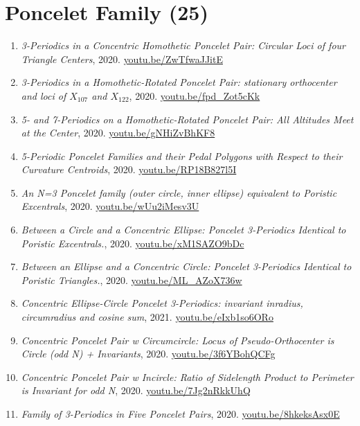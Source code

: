 \documentclass[12pt]{article}
\begin{document}
\section{Poncelet Family (25)}

\begin{enumerate}[resume]
\item \textit{3-Periodics in a Concentric Homothetic Poncelet Pair: Circular Loci of four Triangle Centers}, 2020. \href{https://youtu.be/ZwTfwaJJitE}{\url{youtu.be/ZwTfwaJJitE}}
\item \textit{3-Periodics in a Homothetic-Rotated Poncelet Pair: stationary orthocenter and loci of $X_{107}$ and $X_{122}$}, 2020. \href{https://youtu.be/fpd_Zot5cKk}{\url{youtu.be/fpd\_Zot5cKk}}
\item \textit{5- and 7-Periodics on a Homothetic-Rotated Poncelet Pair: All Altitudes Meet at the Center}, 2020. \href{https://youtu.be/gNHiZvBhKF8}{\url{youtu.be/gNHiZvBhKF8}}
\item \textit{5-Periodic Poncelet Families and their Pedal Polygons with Respect to their Curvature Centroids}, 2020. \href{https://youtu.be/RP18B827l5I}{\url{youtu.be/RP18B827l5I}}
\item \textit{An N=3 Poncelet family (outer circle, inner ellipse) equivalent to Poristic Excentrals}, 2020. \href{https://youtu.be/wUu2iMesv3U}{\url{youtu.be/wUu2iMesv3U}}
\item \textit{Between a Circle and a Concentric Ellipse: Poncelet 3-Periodics Identical to Poristic Excentrals.}, 2020. \href{https://youtu.be/xM1SAZO9bDc}{\url{youtu.be/xM1SAZO9bDc}}
\item \textit{Between an Ellipse and a Concentric Circle: Poncelet 3-Periodics Identical to Poristic Triangles.}, 2020. \href{https://youtu.be/ML_AZoX736w}{\url{youtu.be/ML\_AZoX736w}}
\item \textit{Concentric Ellipse-Circle Poncelet 3-Periodics: invariant inradius, circumradius and cosine sum}, 2021. \href{https://youtu.be/eIxb1so6ORo}{\url{youtu.be/eIxb1so6ORo}}
\item \textit{Concentric Poncelet Pair w Circumcircle: Locus of Pseudo-Orthocenter is Circle (odd N) + Invariants}, 2020. \href{https://youtu.be/3f6YBohQCFg}{\url{youtu.be/3f6YBohQCFg}}
\item \textit{Concentric Poncelet Pair w Incircle: Ratio of Sidelength Product to Perimeter is Invariant for odd N}, 2020. \href{https://youtu.be/7Jg2nRkkUhQ}{\url{youtu.be/7Jg2nRkkUhQ}}
\item \textit{Family of 3-Periodics in Five Poncelet Pairs}, 2020. \href{https://youtu.be/8hkeksAsx0E}{\url{youtu.be/8hkeksAsx0E}}

\end{enumerate}
\end{document}
